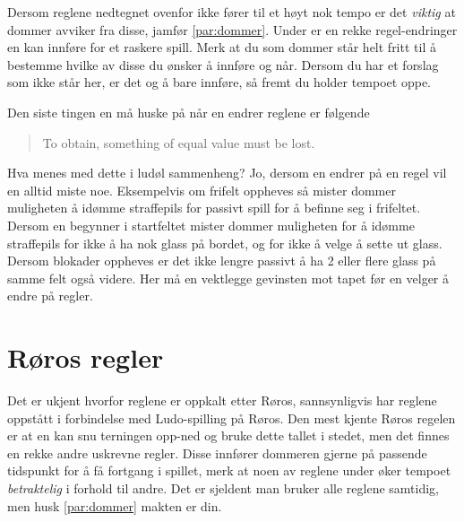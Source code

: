 \documentclass[10pt,a4paper,norsk,openany]{book}
\begin{document}
Dersom reglene nedtegnet ovenfor ikke fører til et høyt nok tempo er det
\emph{viktig} at dommer avviker fra disse, jamfør \cref{par:dommer}. Under er en
rekke regel-endringer en kan innføre for et raskere spill. Merk at du som dommer
står helt fritt til å bestemme hvilke av disse du ønsker å innføre og når.
Dersom du har et forslag som ikke står her, er det og å bare innføre, så fremt
du holder tempoet oppe.

Den siste tingen en må huske på når en endrer reglene er følgende
%
\begin{quote}
  \centering
  To obtain, something of equal value must be lost.
\end{quote}
%
Hva menes med dette i ludøl sammenheng? Jo, dersom en endrer på en regel vil en
alltid miste noe. Eksempelvis om frifelt oppheves så mister dommer muligheten å
idømme straffepils for passivt spill for å befinne seg i frifeltet. Dersom en
begynner i startfeltet mister dommer muligheten for å idømme straffepils for
ikke å ha nok glass på bordet, og for ikke å velge å sette ut glass. Dersom
blokader oppheves er det ikke lengre passivt å ha 2 eller flere glass på samme
felt også videre. Her må en vektlegge gevinsten mot tapet før en velger å endre
på regler.

\newpage

\section{Røros regler}

Det er ukjent hvorfor reglene er oppkalt etter Røros, sannsynligvis har reglene
oppstått i forbindelse med Ludo-spilling på Røros. Den mest kjente Røros regelen
er at en kan snu terningen opp-ned og bruke dette tallet i stedet, men det
finnes en rekke andre uskrevne regler. Disse innfører dommeren gjerne på
passende tidspunkt for å få fortgang i spillet, merk at noen av reglene under
øker tempoet \emph{betraktelig} i forhold til andre. Det er sjeldent man bruker
alle reglene samtidig, men husk \cref{par:dommer} makten er din.
\end{document}
